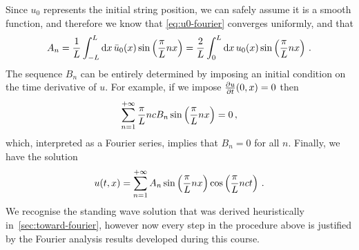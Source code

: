 Since $u_0$ represents the initial string position, we can safely assume it is a smooth
function, and therefore we know that \cref{eq:u0-fourier} converges uniformly, and that
\begin{equation}
  A_n=\frac{1}{L}\int_{-L}^L\mathrm{d} x\,\bar{u}_0(x)\sin\left(\frac{\pi}{L}nx\right)
  =\frac{2}{L}\int_{0}^L\mathrm{d} x\,u_0(x)\sin\left(\frac{\pi}{L}nx\right)\,.
\end{equation}
The sequence $B_n$ can be entirely determined by imposing an initial condition on the time
derivative of $u$. For example, if we impose $\frac{\partial u}{\partial t}(0,x)=0$ then
\begin{equation}
  \sum_{n=1}^{+\infty}\frac{\pi}{L}ncB_n\sin\left(\frac{\pi}{L}nx\right)=0\,,
\end{equation}
which, interpreted as a Fourier series, implies that $B_n=0$ for all $n$. Finally, we have
the solution
\begin{equation}
  u(t,x)=\sum_{n=1}^{+\infty}A_n\sin\left(\frac{\pi}{L}nx\right)\cos\left(\frac{\pi}{L}nct\right)\,.
\end{equation}
We recognise the standing wave solution that was derived heuristically
in~\cref{sec:toward-fourier}, however now every step in the procedure above is justified
by the Fourier analysis results developed during this course.
